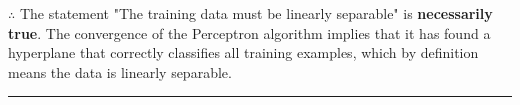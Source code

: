 \documentclass{article}
\begin{document}
\subsubsection*{\normalfont}{$\therefore$ The statement "The training data must be linearly separable" is \textbf{necessarily true}. The convergence of the Perceptron algorithm implies that it has found a hyperplane that correctly classifies all training examples, which by definition means the data is linearly separable.}

\noindent\rule{\textwidth}{0.4pt}\\

\newpage
\begin{center}
\end{center}
\end{document}
